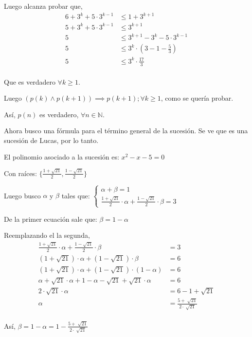 Luego alcanza probar que,
\begin{align*}
    6 + 3^k + 5\cdot 3^{k-1} &\leq 1 + 3^{k+1} \\
    5 + 3^k + 5\cdot 3^{k-1} &\leq 3^{k+1} \\
    5 &\leq 3^{k+1} - 3^k - 5\cdot 3^{k-1} \\
    5 &\leq 3^k \cdot (3 - 1 - \frac{5}{3})\\
    5 &\leq 3^k \cdot \frac{17}{3}\\
\end{align*}

Que es verdadero $ \forall k \geq 1 $.

Luego $(p(k) \wedge p(k+1)) \implies p(k+1); \forall k \geq 1$, como se quería probar.

Así, $p(n)$ es verdadero, $\forall n \in \mathbb{N}$.

Ahora busco una fórmula para el término general de la sucesión. Se ve que es una sucesión de Lucas, por lo tanto.

El polinomio asociado a la sucesión es: $ x^2 - x - 5= 0 $

Con raíces: $ \{ \frac{1+\sqrt{21}}{2}, \frac{1-\sqrt{21}}{2} \} $

Luego busco $ \alpha $ y $ \beta $ tales que:
$\begin{cases}
    \alpha + \beta = 1 \\
    \frac{1+\sqrt{21}}{2} \cdot \alpha + \frac{1-\sqrt{21}}{2} \cdot \beta = 3
\end{cases}$

De la primer ecuación sale que: $ \beta = 1- \alpha $

Reemplazando el la segunda,
\begin{align*}
    \frac{1+\sqrt{21}}{2} \cdot \alpha + \frac{1-\sqrt{21}}{2} \cdot \beta &= 3 \\
    (1+\sqrt{21}) \cdot \alpha + (1-\sqrt{21}) \cdot \beta &= 6 \\
    (1+\sqrt{21}) \cdot \alpha + (1-\sqrt{21}) \cdot (1- \alpha) &= 6 \\
    \alpha +\sqrt{21} \cdot \alpha + 1- \alpha-\sqrt{21} + \sqrt{21} \cdot \alpha &= 6 \\
    2 \cdot \sqrt{21} \cdot \alpha &= 6 - 1 + \sqrt{21} \\
    \alpha &= \frac{5+\sqrt[]{21}}{2\cdot \sqrt[]{21}} \\
\end{align*}

Así, $ \beta = 1 - \alpha = 1 - \frac{5+\sqrt[]{21}}{2\cdot \sqrt[]{21}} $

